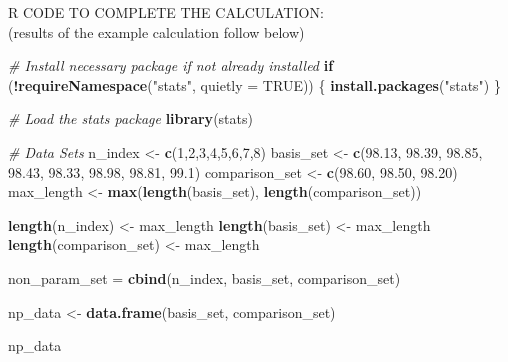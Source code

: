 \documentclass[
  12pt,
  a4paper,
]{article}
\newenvironment{Shaded}{\begin{snugshade}}{\end{snugshade}}
\newcommand{\AttributeTok}[1]{\textcolor[rgb]{0.13,0.29,0.53}{#1}}
\newcommand{\CommentTok}[1]{\textcolor[rgb]{0.56,0.35,0.01}{\textit{#1}}}
\newcommand{\ConstantTok}[1]{\textcolor[rgb]{0.56,0.35,0.01}{#1}}
\newcommand{\ControlFlowTok}[1]{\textcolor[rgb]{0.13,0.29,0.53}{\textbf{#1}}}
\newcommand{\DecValTok}[1]{\textcolor[rgb]{0.00,0.00,0.81}{#1}}
\newcommand{\FloatTok}[1]{\textcolor[rgb]{0.00,0.00,0.81}{#1}}
\newcommand{\FunctionTok}[1]{\textcolor[rgb]{0.13,0.29,0.53}{\textbf{#1}}}
\newcommand{\NormalTok}[1]{#1}
\newcommand{\OtherTok}[1]{\textcolor[rgb]{0.56,0.35,0.01}{#1}}
\newcommand{\SpecialCharTok}[1]{\textcolor[rgb]{0.81,0.36,0.00}{\textbf{#1}}}
\newcommand{\StringTok}[1]{\textcolor[rgb]{0.31,0.60,0.02}{#1}}
\numberwithin{equation}{section}
\theoremstyle{plain}
\theoremstyle{definition}
\theoremstyle{remark}
\theoremstyle{note}
\begin{document}
R CODE TO COMPLETE THE CALCULATION:\\
(results of the example calculation follow below)

\begin{Shaded}
\begin{Highlighting}[]
\CommentTok{\# Install necessary package if not already installed}
\ControlFlowTok{if}\NormalTok{ (}\SpecialCharTok{!}\FunctionTok{requireNamespace}\NormalTok{(}\StringTok{"stats"}\NormalTok{, }\AttributeTok{quietly =} \ConstantTok{TRUE}\NormalTok{)) \{}
    \FunctionTok{install.packages}\NormalTok{(}\StringTok{"stats"}\NormalTok{)}
\NormalTok{\}}

\CommentTok{\# Load the stats package}
\FunctionTok{library}\NormalTok{(stats)}

\CommentTok{\# Data Sets}
\NormalTok{n\_index }\OtherTok{\textless{}{-}} \FunctionTok{c}\NormalTok{(}\DecValTok{1}\NormalTok{,}\DecValTok{2}\NormalTok{,}\DecValTok{3}\NormalTok{,}\DecValTok{4}\NormalTok{,}\DecValTok{5}\NormalTok{,}\DecValTok{6}\NormalTok{,}\DecValTok{7}\NormalTok{,}\DecValTok{8}\NormalTok{)}
\NormalTok{basis\_set }\OtherTok{\textless{}{-}} \FunctionTok{c}\NormalTok{(}\FloatTok{98.13}\NormalTok{, }\FloatTok{98.39}\NormalTok{, }\FloatTok{98.85}\NormalTok{, }\FloatTok{98.43}\NormalTok{, }\FloatTok{98.33}\NormalTok{, }\FloatTok{98.98}\NormalTok{, }\FloatTok{98.81}\NormalTok{, }\FloatTok{99.1}\NormalTok{)}
\NormalTok{comparison\_set }\OtherTok{\textless{}{-}} \FunctionTok{c}\NormalTok{(}\FloatTok{98.60}\NormalTok{, }\FloatTok{98.50}\NormalTok{, }\FloatTok{98.20}\NormalTok{)}
\NormalTok{max\_length }\OtherTok{\textless{}{-}} \FunctionTok{max}\NormalTok{(}\FunctionTok{length}\NormalTok{(basis\_set), }\FunctionTok{length}\NormalTok{(comparison\_set))}

\FunctionTok{length}\NormalTok{(n\_index) }\OtherTok{\textless{}{-}}\NormalTok{ max\_length}
\FunctionTok{length}\NormalTok{(basis\_set) }\OtherTok{\textless{}{-}}\NormalTok{ max\_length                      }
\FunctionTok{length}\NormalTok{(comparison\_set) }\OtherTok{\textless{}{-}}\NormalTok{ max\_length }

\NormalTok{non\_param\_set }\OtherTok{=} \FunctionTok{cbind}\NormalTok{(n\_index, basis\_set, comparison\_set)}

\NormalTok{np\_data }\OtherTok{\textless{}{-}} \FunctionTok{data.frame}\NormalTok{(basis\_set, comparison\_set) }

\NormalTok{np\_data}
\end{Highlighting}
\end{Shaded}
\end{document}
